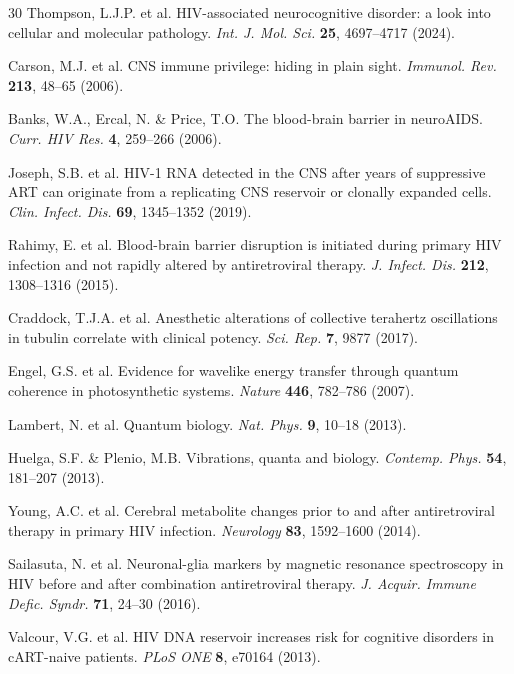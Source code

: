 \documentclass[10pt,a4paper]{article}
\begin{document}
\begin{thebibliography}{30}
Thompson, L.J.P. et al. HIV-associated neurocognitive disorder: a look into cellular and molecular pathology. \textit{Int. J. Mol. Sci.} \textbf{25}, 4697--4717 (2024).

Carson, M.J. et al. CNS immune privilege: hiding in plain sight. \textit{Immunol. Rev.} \textbf{213}, 48--65 (2006).

Banks, W.A., Ercal, N. \& Price, T.O. The blood-brain barrier in neuroAIDS. \textit{Curr. HIV Res.} \textbf{4}, 259--266 (2006).

Joseph, S.B. et al. HIV-1 RNA detected in the CNS after years of suppressive ART can originate from a replicating CNS reservoir or clonally expanded cells. \textit{Clin. Infect. Dis.} \textbf{69}, 1345--1352 (2019).

Rahimy, E. et al. Blood-brain barrier disruption is initiated during primary HIV infection and not rapidly altered by antiretroviral therapy. \textit{J. Infect. Dis.} \textbf{212}, 1308--1316 (2015).

Craddock, T.J.A. et al. Anesthetic alterations of collective terahertz oscillations in tubulin correlate with clinical potency. \textit{Sci. Rep.} \textbf{7}, 9877 (2017).

Engel, G.S. et al. Evidence for wavelike energy transfer through quantum coherence in photosynthetic systems. \textit{Nature} \textbf{446}, 782--786 (2007).

Lambert, N. et al. Quantum biology. \textit{Nat. Phys.} \textbf{9}, 10--18 (2013).

Huelga, S.F. \& Plenio, M.B. Vibrations, quanta and biology. \textit{Contemp. Phys.} \textbf{54}, 181--207 (2013).

Young, A.C. et al. Cerebral metabolite changes prior to and after antiretroviral therapy in primary HIV infection. \textit{Neurology} \textbf{83}, 1592--1600 (2014).

Sailasuta, N. et al. Neuronal-glia markers by magnetic resonance spectroscopy in HIV before and after combination antiretroviral therapy. \textit{J. Acquir. Immune Defic. Syndr.} \textbf{71}, 24--30 (2016).

Valcour, V.G. et al. HIV DNA reservoir increases risk for cognitive disorders in cART-naive patients. \textit{PLoS ONE} \textbf{8}, e70164 (2013).


\end{thebibliography}
\end{document}
